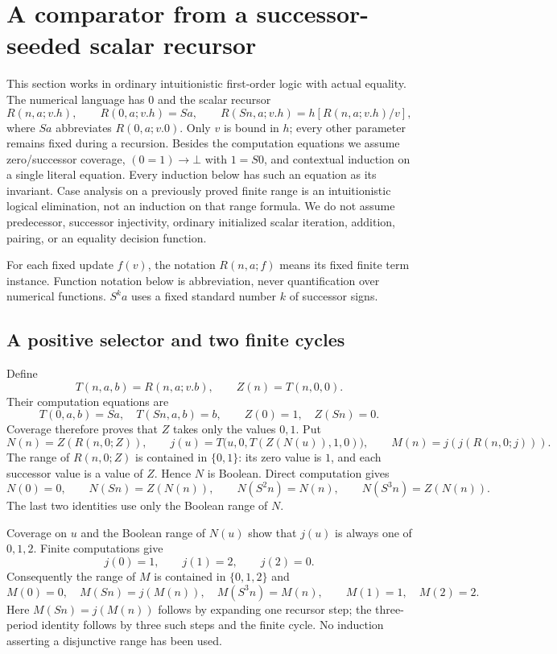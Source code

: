 \section{A comparator from a successor-seeded scalar recursor}
\label{sec:sr-comparator}

This section works in ordinary intuitionistic first-order logic with
actual equality. The numerical language has $0$ and the scalar recursor
\[
 R(n,a;v.h),\qquad R(0,a;v.h)=Sa,\qquad
 R(Sn,a;v.h)=h[R(n,a;v.h)/v],
\]
where $S a$ abbreviates $R(0,a;v.0)$. Only $v$ is bound in $h$;
every other parameter remains fixed during a recursion. Besides the
computation equations we assume zero/successor coverage,
$(0=1)\to\bot$ with $1=S0$, and contextual induction on a single literal
equation. Every induction below has such an equation as its invariant.
Case analysis on a previously proved finite range is an intuitionistic
logical elimination, not an induction on that range formula. We do not
assume predecessor, successor injectivity, ordinary initialized scalar
iteration, addition, pairing, or an equality decision function.

For each fixed update $f(v)$, the notation $R(n,a;f)$ means its fixed
finite term instance. Function notation below is abbreviation, never
quantification over numerical functions. $S^k a$ uses a fixed standard
number $k$ of successor signs.

\subsection{A positive selector and two finite cycles}

Define
\[
 T(n,a,b)=R(n,a;v.b),\qquad Z(n)=T(n,0,0).
\]
Their computation equations are
\[
 T(0,a,b)=Sa,\quad T(Sn,a,b)=b,\qquad Z(0)=1,\quad Z(Sn)=0.
\]
Coverage therefore proves that $Z$ takes only the values $0,1$.
Put
\[
 N(n)=Z(R(n,0;Z)),\qquad
 j(u)=T\bigl(u,0,T(Z(N(u)),1,0)\bigr),
 \qquad M(n)=j(j(R(n,0;j))).
\]
The range of $R(n,0;Z)$ is contained in $\{0,1\}$: its zero value is
$1$, and each successor value is a value of $Z$. Hence $N$ is Boolean.
Direct computation gives
\[
 N(0)=0,\qquad N(Sn)=Z(N(n)),\qquad
 N(S^2n)=N(n),\qquad N(S^3n)=Z(N(n)).                 \tag{N}
\]
The last two identities use only the Boolean range of $N$.

Coverage on $u$ and the Boolean range of $N(u)$ show that $j(u)$ is
always one of $0,1,2$. Finite computations give
\[
 j(0)=1,\qquad j(1)=2,\qquad j(2)=0.
\]
Consequently the range of $M$ is contained in $\{0,1,2\}$ and
\[
 M(0)=0,\quad M(Sn)=j(M(n)),\quad M(S^3n)=M(n),
 \qquad M(1)=1,\quad M(2)=2.                         \tag{M}
\]
Here $M(Sn)=j(M(n))$ follows by expanding one recursor step; the
three-period identity follows by three such steps and the finite cycle.
No induction asserting a disjunctive range has been used.

